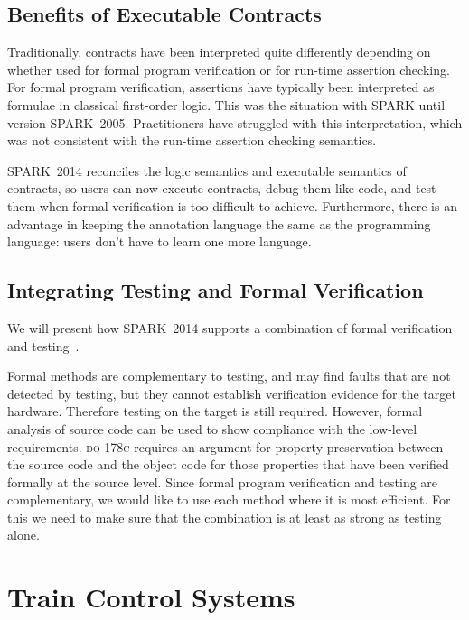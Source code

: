 \documentclass[10pt,a4paper,twocolumn]{article}
\newcommand{\DOC}{\textsc{do-178c}\xspace}
\newcommand{\oldspark}{SPARK~2005\xspace}
\newcommand{\newspark}{SPARK~2014\xspace}
\begin{document}
\subsection{Benefits of Executable Contracts}

Traditionally, contracts have been interpreted quite differently depending on
whether used for formal program verification or for run-time assertion
checking. For formal program verification, assertions have typically been
interpreted as formulae in classical first-order logic. This was the situation
with SPARK until version \oldspark. Practitioners have struggled with this
interpretation, which was not consistent with the run-time assertion checking
semantics.\cite{tseChalin10}

\newspark reconciles the logic semantics and executable semantics of contracts,
so users can now execute contracts, debug them like code, and test them when
formal verification is too difficult to achieve. Furthermore, there is an
advantage in keeping the annotation language the same as the programming
language: users don't have to learn one more language.

\subsection{Integrating Testing and Formal Verification}

\ifdefined\abstractonly

We will present how \newspark supports a combination of formal verification and
testing~\cite{hiliteERTS2012}.

\else
Formal methods are complementary to testing, and may find faults that
are not detected by testing, but they cannot establish verification
evidence for the target hardware. Therefore testing on the target is
still required. However, formal analysis of source code can be used to
show compliance with the low-level requirements. \DOC requires an
argument for property preservation between the source code and the
object code for those properties that have been verified formally at
the source level. Since formal program verification and testing are
complementary, we would like to use each method where it is most
efficient. For this we need to make sure that the combination is at
least as strong as testing alone.
\fi

\section{Train Control Systems}
\end{document}
